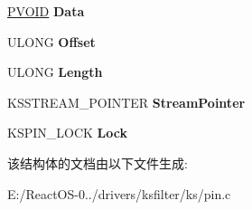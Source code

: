 \begin{DoxyCompactItemize}
\mbox{\label{struct___k_s_i_s_t_r_e_a_m___p_o_i_n_t_e_r_a99a73d76c2a665d53cba1920386fdbdb}} 
\hyperlink{interfacevoid}{P\+V\+O\+ID} {\bfseries Data}
\item 
\mbox{\label{struct___k_s_i_s_t_r_e_a_m___p_o_i_n_t_e_r_ae20fc3bfdad399d0c59af038adb7851c}} 
U\+L\+O\+NG {\bfseries Offset}
\item 
\mbox{\label{struct___k_s_i_s_t_r_e_a_m___p_o_i_n_t_e_r_a37645a6095531cb6a529033e3b70f9a3}} 
U\+L\+O\+NG {\bfseries Length}
\item 
\mbox{\label{struct___k_s_i_s_t_r_e_a_m___p_o_i_n_t_e_r_a0252223391703fbac9ce3da1075585ca}} 
K\+S\+S\+T\+R\+E\+A\+M\+\_\+\+P\+O\+I\+N\+T\+ER {\bfseries Stream\+Pointer}
\item 
\mbox{\label{struct___k_s_i_s_t_r_e_a_m___p_o_i_n_t_e_r_a4bd943fba4be32df221e4901d8c8e765}} 
K\+S\+P\+I\+N\+\_\+\+L\+O\+CK {\bfseries Lock}
\end{DoxyCompactItemize}


该结构体的文档由以下文件生成\+:\begin{DoxyCompactItemize}
\item 
E\+:/\+React\+O\+S-\/0../drivers/ksfilter/ks/pin.\+c\end{DoxyCompactItemize}
